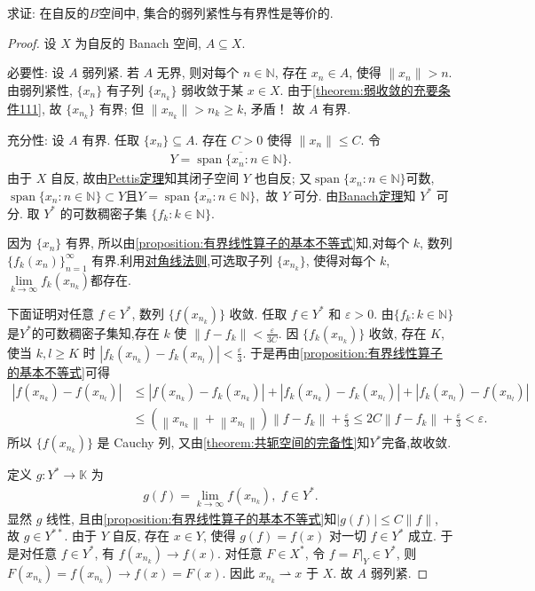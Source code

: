 \documentclass[../../main.tex]{subfiles}%
\begin{document}
\begin{proposition}\label{proposition:自反空间中弱列紧性等价与有界}
求证: 在自反的$B$空间中, 集合的弱列紧性与有界性是等价的.
\end{proposition}
\begin{proof}

设 $X$ 为自反的 Banach 空间, $A\subseteq X$. 

{\heiti 必要性:} 设 $A$ 弱列紧. 若 $A$ 无界, 则对每个 $n\in\mathbb{N}$, 存在 $x_n\in A$, 使得 $\|x_n\|>n$. 由弱列紧性, $\{x_n\}$ 有子列 $\{x_{n_k}\}$ 弱收敛于某 $x\in X$. 由于\cref{theorem:弱收敛的充要条件111}, 故 $\{x_{n_k}\}$ 有界; 但 $\|x_{n_k}\|>n_k\geqslant k$, 矛盾！ 故 $A$ 有界.

{\heiti 充分性:} 设 $A$ 有界. 任取 $\{x_n\}\subseteq A$. 存在 $C>0$ 使得 $\|x_n\|\leqslant C$. 令
\begin{align*}
Y=\overline{\operatorname{span}\{x_n:n\in\mathbb{N}\}}.
\end{align*}
由于 $X$ 自反, 故由\hyperref[theorem:Pettis定理]{Pettis定理}知其闭子空间 $Y$ 也自反; 又$\operatorname{span}\{x_n:n\in\mathbb{N}\}$可数,$\operatorname{span}\{x_n:n\in\mathbb{N}\}\subset Y$且$Y=\overline{\operatorname{span}\{x_n:n\in\mathbb{N}\}},$ 故 $Y$ 可分. 由\hyperref[theorem:泛函分析------Banach定理]{Banach定理}知 $Y^*$ 可分. 取 $Y^*$ 的可数稠密子集 $\{f_k:k\in\mathbb{N}\}$.

因为 $\{x_n\}$ 有界, 所以由\cref{proposition:有界线性算子的基本不等式}知,对每个 $k$, 数列 $\{f_k(x_n)\}_{n=1}^{\infty}$ 有界.利用\hyperref[proposition:对角线法则]{对角线法则},可选取子列 $\{x_{n_k}\}$, 使得对每个 $k$, $\lim\limits_{k\to\infty} f_k(x_{n_k})$都存在.

下面证明对任意 $f\in Y^*$, 数列 $\{f(x_{n_k})\}$ 收敛. 任取 $f\in Y^*$ 和 $\varepsilon>0$. 由$\{f_k:k\in\mathbb{N}\}$是$Y^*$的可数稠密子集知,存在 $k$ 使 $\|f-f_k\|<\frac{\varepsilon}{3C}$. 因 $\{f_k(x_{n_k})\}$ 收敛, 存在 $K$, 使当 $k,l\geqslant K$ 时 $|f_k(x_{n_k})-f_k(x_{n_l})|<\frac{\varepsilon}{3}$. 于是再由\cref{proposition:有界线性算子的基本不等式}可得
\begin{align*}
|f(x_{n_k})-f(x_{n_l})|
&\leqslant |f(x_{n_k})-f_k(x_{n_k})|+|f_k(x_{n_k})-f_k(x_{n_l})|+|f_k(x_{n_l})-f(x_{n_l})|\\
&\leqslant \left( \left\| x_{n_k} \right\| +\left\| x_{n_l} \right\| \right) \left\| f-f_k \right\| +\frac{\varepsilon}{3}\leqslant 2C\left\| f-f_k \right\| +\frac{\varepsilon}{3}<\varepsilon .
\end{align*}
所以 $\{f(x_{n_k})\}$ 是 Cauchy 列, 又由\cref{theorem:共轭空间的完备性}知$Y^*$完备,故收敛.

定义 $g: Y^*\to\mathbb{K}$ 为
\begin{align*}
g(f)=\lim\limits_{k\to\infty} f(x_{n_k}),\,\,f\in Y^*.
\end{align*}
显然 $g$ 线性, 且由\cref{proposition:有界线性算子的基本不等式}知$|g(f)|\leqslant C\|f\|$, 故 $g\in Y^{**}$. 由于 $Y$ 自反, 存在 $x\in Y$, 使得 $g(f)=f(x)$ 对一切 $f\in Y^*$ 成立. 于是对任意 $f\in Y^*$, 有 $f(x_{n_k})\to f(x)$. 对任意 $F\in X^*$, 令 $f=F|_Y\in Y^*$, 则 $F(x_{n_k})=f(x_{n_k})\to f(x)=F(x)$. 因此 $x_{n_k}\rightharpoonup x$ 于 $X$. 故 $A$ 弱列紧.
\end{proof}
\end{document}
